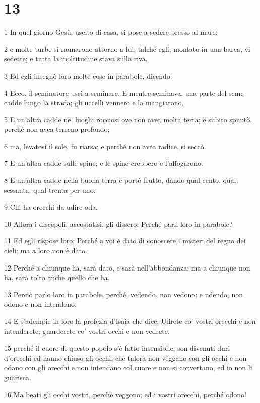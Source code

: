 \chapter{13}

\par 1 In quel giorno Gesù, uscito di casa, si pose a sedere presso al mare;
\par 2 e molte turbe si raunarono attorno a lui; talché egli, montato in una barca, vi sedette; e tutta la moltitudine stava sulla riva.
\par 3 Ed egli insegnò loro molte cose in parabole, dicendo:
\par 4 Ecco, il seminatore uscì a seminare. E mentre seminava, una parte del seme cadde lungo la strada; gli uccelli vennero e la mangiarono.
\par 5 E un'altra cadde ne' luoghi rocciosi ove non avea molta terra; e subito spuntò, perché non avea terreno profondo;
\par 6 ma, levatosi il sole, fu riarsa; e perché non avea radice, si seccò.
\par 7 E un'altra cadde sulle spine; e le spine crebbero e l'affogarono.
\par 8 E un'altra cadde nella buona terra e portò frutto, dando qual cento, qual sessanta, qual trenta per uno.
\par 9 Chi ha orecchi da udire oda.
\par 10 Allora i discepoli, accostatisi, gli dissero: Perché parli loro in parabole?
\par 11 Ed egli rispose loro: Perché a voi è dato di conoscere i misteri del regno dei cieli; ma a loro non è dato.
\par 12 Perché a chiunque ha, sarà dato, e sarà nell'abbondanza; ma a chiunque non ha, sarà tolto anche quello che ha.
\par 13 Perciò parlo loro in parabole, perché, vedendo, non vedono; e udendo, non odono e non intendono.
\par 14 E s'adempie in loro la profezia d'Isaia che dice: Udrete co' vostri orecchi e non intenderete; guarderete co' vostri occhi e non vedrete:
\par 15 perché il cuore di questo popolo s'è fatto insensibile, son divenuti duri d'orecchi ed hanno chiuso gli occhi, che talora non veggano con gli occhi e non odano con gli orecchi e non intendano col cuore e non si convertano, ed io non li guarisca.
\par 16 Ma beati gli occhi vostri, perché veggono; ed i vostri orecchi, perché odono!
